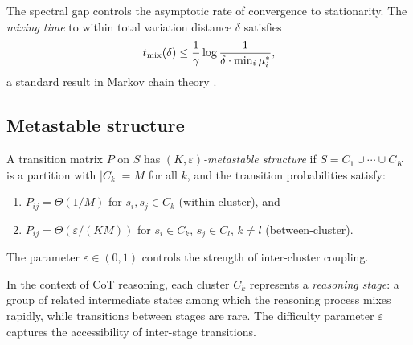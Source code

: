 The spectral gap controls the asymptotic rate of convergence to stationarity.
The \emph{mixing time} to within total variation distance $\delta$ satisfies
\begin{equation}\label{eq:mixing}
  t_{\operatorname{mix}}(\delta) \le \frac{1}{\gamma} \log \frac{1}{\delta \cdot \min_i \mu^*_i},
\end{equation}
a standard result in Markov chain theory \cite{levin2009markov}.

\subsection{Metastable structure}

\begin{definition}\label{def:meta}
A transition matrix $P$ on $S$ has \emph{$(K, \varepsilon)$-metastable structure}
if $S = C_1 \cup \cdots \cup C_K$ is a partition with $|C_k| = M$ for all $k$,
and the transition probabilities satisfy:
\begin{enumerate}[label=(\roman*)]
\item $P_{ij} = \Theta(1/M)$ for $s_i, s_j \in C_k$ (within-cluster), and
\item $P_{ij} = \Theta(\varepsilon / (KM))$ for $s_i \in C_k$, $s_j \in C_l$,
  $k \ne l$ (between-cluster).
\end{enumerate}
The parameter $\varepsilon \in (0, 1)$ controls the strength of inter-cluster
coupling.
\end{definition}

In the context of CoT reasoning, each cluster $C_k$ represents a
\emph{reasoning stage}: a group of related intermediate states among which the
reasoning process mixes rapidly, while transitions between stages are rare.
The difficulty parameter $\varepsilon$ captures the accessibility of
inter-stage transitions.
